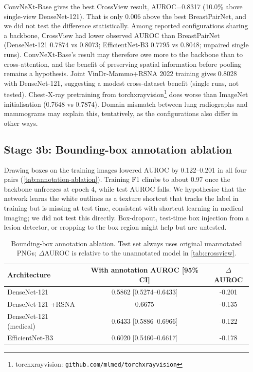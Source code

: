 \documentclass[conference]{IEEEtran}
\newcommand{\vindr}{VinDr-Mammo}
\newcommand{\rsna}{RSNA 2022}
\begin{document}
ConvNeXt-Base gives the best CrossView result, AUROC=0.8317 (10.0\% above single-view DenseNet-121). That is only 0.006 above the best BreastPairNet, and we did not test the difference statistically. Among reported configurations sharing a backbone, CrossView had lower observed AUROC than BreastPairNet (DenseNet-121 0.7874 vs 0.8073; EfficientNet-B3 0.7795 vs 0.8048; unpaired single runs). ConvNeXt-Base's result may therefore owe more to the backbone than to cross-attention, and the benefit of preserving spatial information before pooling remains a hypothesis. Joint \vindr{}+\rsna{} training gives 0.8028 with DenseNet-121, suggesting a modest cross-dataset benefit (single runs, not tested). Chest-X-ray pretraining from torchxrayvision\footnote{torchxrayvision: \texttt{github.com/mlmed/torchxrayvision}} does worse than ImageNet initialisation (0.7648 vs 0.7874). Domain mismatch between lung radiographs and mammograms may explain this, tentatively, as the configurations also differ in other ways.

\subsection{Stage 3b: Bounding-box annotation ablation}

Drawing boxes on the training images lowered AUROC by 0.122--0.201 in all four pairs (\autoref{tab:annotation-ablation}). Training F1 climbs to about 0.97 once the backbone unfreezes at epoch 4, while test AUROC falls. We hypothesise that the network learns the white outlines as a texture shortcut that tracks the label in training but is missing at test time, consistent with shortcut learning in medical imaging; we did not test this directly. Box-dropout, test-time box injection from a lesion detector, or cropping to the box region might help but are untested.

\begin{table}[!t]
\centering
\caption{Bounding-box annotation ablation. Test set always uses original unannotated PNGs; $\Delta$AUROC is relative to the unannotated model in \autoref{tab:crossview}.}
\label{tab:annotation-ablation}
{\scriptsize\setlength{\tabcolsep}{2.5pt}%
\begin{tabular}{|l|c|c|}
\hline
\textbf{Architecture} & \textbf{With annotation AUROC [95\% CI]} & \textbf{\(\Delta\)AUROC} \\
\hline
DenseNet-121 & 0.5862 [0.5274--0.6433] & -0.201 \\
\hline
DenseNet-121 +RSNA & 0.6675 & -0.135 \\
\hline
DenseNet-121 (medical) & 0.6433 [0.5886--0.6966] & -0.122 \\
\hline
EfficientNet-B3 & 0.6020 [0.5460--0.6617] & -0.178 \\
\hline
\end{tabular}}
\end{table}
\end{document}
